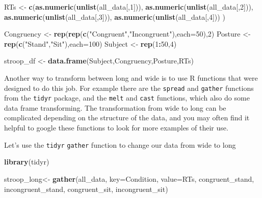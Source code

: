 \documentclass[
]{book}
\newenvironment{Shaded}{\begin{snugshade}}{\end{snugshade}}
\newcommand{\AttributeTok}[1]{\textcolor[rgb]{0.13,0.29,0.53}{#1}}
\newcommand{\DecValTok}[1]{\textcolor[rgb]{0.00,0.00,0.81}{#1}}
\newcommand{\FunctionTok}[1]{\textcolor[rgb]{0.13,0.29,0.53}{\textbf{#1}}}
\newcommand{\NormalTok}[1]{#1}
\newcommand{\OtherTok}[1]{\textcolor[rgb]{0.56,0.35,0.01}{#1}}
\newcommand{\SpecialCharTok}[1]{\textcolor[rgb]{0.81,0.36,0.00}{\textbf{#1}}}
\newcommand{\StringTok}[1]{\textcolor[rgb]{0.31,0.60,0.02}{#1}}
\begin{document}
\begin{Shaded}
\begin{Highlighting}[]
\NormalTok{RTs }\OtherTok{\textless{}{-}} \FunctionTok{c}\NormalTok{(}\FunctionTok{as.numeric}\NormalTok{(}\FunctionTok{unlist}\NormalTok{(all\_data[,}\DecValTok{1}\NormalTok{])),}
         \FunctionTok{as.numeric}\NormalTok{(}\FunctionTok{unlist}\NormalTok{(all\_data[,}\DecValTok{2}\NormalTok{])),}
         \FunctionTok{as.numeric}\NormalTok{(}\FunctionTok{unlist}\NormalTok{(all\_data[,}\DecValTok{3}\NormalTok{])),}
         \FunctionTok{as.numeric}\NormalTok{(}\FunctionTok{unlist}\NormalTok{(all\_data[,}\DecValTok{4}\NormalTok{]))}
\NormalTok{         )}

\NormalTok{Congruency }\OtherTok{\textless{}{-}} \FunctionTok{rep}\NormalTok{(}\FunctionTok{rep}\NormalTok{(}\FunctionTok{c}\NormalTok{(}\StringTok{"Congruent"}\NormalTok{,}\StringTok{"Incongruent"}\NormalTok{),}\AttributeTok{each=}\DecValTok{50}\NormalTok{),}\DecValTok{2}\NormalTok{)}
\NormalTok{Posture }\OtherTok{\textless{}{-}} \FunctionTok{rep}\NormalTok{(}\FunctionTok{c}\NormalTok{(}\StringTok{"Stand"}\NormalTok{,}\StringTok{"Sit"}\NormalTok{),}\AttributeTok{each=}\DecValTok{100}\NormalTok{)}
\NormalTok{Subject }\OtherTok{\textless{}{-}} \FunctionTok{rep}\NormalTok{(}\DecValTok{1}\SpecialCharTok{:}\DecValTok{50}\NormalTok{,}\DecValTok{4}\NormalTok{)}

\NormalTok{stroop\_df }\OtherTok{\textless{}{-}} \FunctionTok{data.frame}\NormalTok{(Subject,Congruency,Posture,RTs)}
\end{Highlighting}
\end{Shaded}

Another way to transform between long and wide is to use R functions that were designed to do this job. For example there are the \texttt{spread} and \texttt{gather} functions from the \texttt{tidyr} package, and the \texttt{melt} and \texttt{cast} functions, which also do some data frame transforming. The transformation from wide to long can be complicated depending on the structure of the data, and you may often find it helpful to google these functions to look for more examples of their use.

Let's use the \texttt{tidyr} \texttt{gather} function to change our data from wide to long

\begin{Shaded}
\begin{Highlighting}[]
\FunctionTok{library}\NormalTok{(tidyr)}

\NormalTok{stroop\_long}\OtherTok{\textless{}{-}} \FunctionTok{gather}\NormalTok{(all\_data, }\AttributeTok{key=}\NormalTok{Condition, }\AttributeTok{value=}\NormalTok{RTs, }
\NormalTok{                     congruent\_stand, incongruent\_stand,}
\NormalTok{                     congruent\_sit, incongruent\_sit)}
\end{Highlighting}
\end{Shaded}
\end{document}
